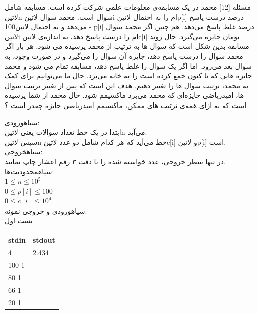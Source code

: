 ‌مسئله [12]
محمد در یک مسابقه‌ی معلومات علمی شرکت کرده است. مسابقه شامل ‌لاتین{n} سوال است. محمد سوال ‌لاتین{i} ام را به احتمال ‌لاتین{p[i]} درصد درست پاسخ می‌دهد و به احتمال ‌لاتین{100 - p[i]} درصد غلط پاسخ می‌دهد. هم چنین اگر محمد سوال ‌لاتین{i} ام را درست پاسخ دهد، به اندازه‌ی ‌لاتین{c[i]} تومان جایزه می‌گیرد. حال روند مسابقه بدین شکل است که سوال ها به ترتیب از محمد پرسیده می شود. هر بار اگر محمد سوال را درست پاسخ دهد، جایزه آن سوال را می‌گیرد و در صورت وجود، به سوال بعد می‌رود. اما اگر یک سوال را غلط پاسخ دهد، مسابقه تمام می شود و محمد جایزه هایی که تا کنون جمع کرده است را به خانه می‌برد. حال ما می‌توانیم برای کمک به محمد، ترتیب سوال ها را تغییر دهیم. هدف این است که پس از تغییر ترتیب سوال ها، امیدریاضی جایزه‌ای که محمد می‌برد ماکسیمم شود. حال محمد از شما پرسیده است که به ازای همه‌ی ترتیب های ممکن، ماکسیمم امیدریاضی جایزه چقدر است ؟

‌سیاه{ورودی:}\\
ابتدا در یک خط تعداد سوالات یعنی ‌لاتین{n} می‌آید.\\
سپس ‌لاتین{n} خط می‌آید که هر کدام شامل دو عدد  ‌لاتین{c[i]} و  ‌لاتین{p[i]} است.\\
‌سیاه{خروجی:}\\
در تنها سطر خروجی، عدد خواسته شده را با دقت ۳ رقم اعشار چاپ نمایید.\\
‌سیاه{محدودیت‌ها:}\\
$1 \leq n \leq 10^{5}$\\
$0 \leq p[i] \leq 100$\\
$0 \leq c[i] \leq 10^{4}$\\

‌سیاه{ورودی و خروجی نمونه:}\\

تست اول
\begin{latin}
	\begin{tabularx}{\textwidth}{|X | X|}
		\hline
		\textbf{stdin} &
		\textbf{stdout}\\
		\hline
		4 & 2.434\\
		100 1&\\
		80 1 &\\
		66 1&\\
		20 1&\\
		\hline
	\end{tabularx}
\end{latin}

